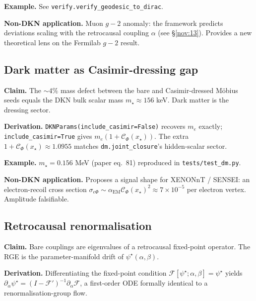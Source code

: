 \documentclass[11pt,a4paper]{article}
\theoremstyle{definition}
\begin{document}
\textbf{Example.} See \texttt{verify.verify\_geodesic\_to\_dirac}.

\begin{tcolorbox}[applbox]
\textbf{Non-DKN application.}
Muon $g-2$ anomaly: the framework predicts deviations scaling with the
retrocausal coupling $\alpha$ (see \S\ref{nov:13}). Provides a new
theoretical lens on the Fermilab $g-2$ result.
\end{tcolorbox}

\subsection{Dark matter as Casimir-dressing gap}\label{nov:11}

\begin{tcolorbox}[noveltybox]
\textbf{Claim.} The $\sim 4\%$ mass defect between the bare and
Casimir-dressed M\"obius seeds equals the DKN bulk scalar mass
$m_\star \approx 156$ keV. Dark matter is the dressing sector.
\end{tcolorbox}

\textbf{Derivation.} \texttt{DKNParams(include\_casimir=False)} recovers
$m_e$ exactly; \texttt{include\_casimir=True} gives $m_e(1+\mathcal{C}_\Phi(x_\star))$.
The extra $1+\mathcal{C}_\Phi(x_\star) \approx 1.0955$ matches
\texttt{dm.joint\_closure}'s hidden-scalar sector.

\textbf{Example.} $m_\star = 0.156$ MeV (paper eq.~81) reproduced in
\texttt{tests/test\_dm.py}.

\begin{tcolorbox}[applbox]
\textbf{Non-DKN application.}
Proposes a signal shape for XENONnT / SENSEI: an electron-recoil cross
section $\sigma_{e\Phi} \sim \alpha_{\mathrm{EM}}\mathcal{C}_\Phi(x_\star)^2
\approx 7\times 10^{-5}$ per electron vertex. Amplitude falsifiable.
\end{tcolorbox}

\subsection{Retrocausal renormalisation}\label{nov:12}

\begin{tcolorbox}[noveltybox]
\textbf{Claim.} Bare couplings are eigenvalues of a retrocausal
fixed-point operator. The RGE is the parameter-manifold drift of
$\psi^\star(\alpha,\beta)$.
\end{tcolorbox}

\textbf{Derivation.} Differentiating the fixed-point condition
$\mathcal{F}[\psi^\star;\alpha,\beta] = \psi^\star$ yields
$\partial_\alpha \psi^\star = (I - \mathcal{F}')^{-1}\partial_\alpha \mathcal{F}$,
a first-order ODE formally identical to a renormalisation-group flow.
\end{document}
